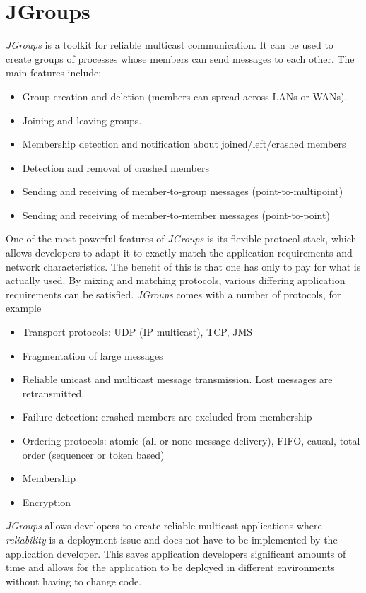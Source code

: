 \section{JGroups}
\emph{JGroups} is a toolkit for reliable multicast communication. It can be used to create groups of processes whose members can send messages to each other. The main features include:

\begin{itemize}
 \item Group creation and deletion (members can spread across LANs or WANs).
 \item Joining and leaving groups.
 \item Membership detection and notification about joined/left/crashed members
 \item Detection and removal of crashed members
 \item Sending and receiving of member-to-group messages (point-to-multipoint)
 \item Sending and receiving of member-to-member messages (point-to-point)
\end{itemize}

One of the most powerful features of \emph{JGroups} is its flexible protocol stack, which allows developers to adapt it to exactly match the application requirements and network characteristics. The benefit of this is that one has only to pay for what is actually used. By mixing and matching protocols, various differing application requirements can be satisfied. \emph{JGroups} comes with a number of protocols, for example

\begin{itemize}
 \item Transport protocols: UDP (IP multicast), TCP, JMS
 \item Fragmentation of large messages
 \item Reliable unicast and multicast message transmission. Lost messages are
       retransmitted.
 \item Failure detection: crashed members are excluded from membership
 \item Ordering protocols: atomic (all-or-none message delivery), FIFO, causal,
       total order (sequencer or token based)
 \item Membership
 \item Encryption
\end{itemize}

\emph{JGroups} allows developers to create reliable multicast applications where
\emph{reliability} is a deployment issue and does not have to be implemented by the application developer. This saves application developers significant amounts of time and allows for the application to be deployed in different environments without having to change code.

